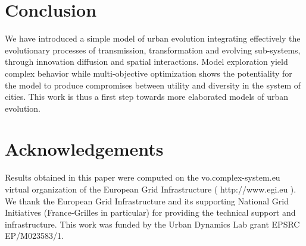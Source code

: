 \documentclass[letterpaper]{article}
\begin{document}
\section{Conclusion}

We have introduced a simple model of urban evolution integrating effectively the evolutionary processes of transmission, transformation and evolving sub-systems, through innovation diffusion and spatial interactions. Model exploration yield complex behavior while multi-objective optimization shows the potentiality for the model to produce compromises between utility and diversity in the system of cities. This work is thus a first step towards more elaborated models of urban evolution.


\bigskip

\section{Acknowledgements}

Results obtained in this paper were computed on the vo.complex-system.eu virtual organization of the European Grid Infrastructure ( http://www.egi.eu ). We thank the European Grid Infrastructure and its supporting National Grid Initiatives (France-Grilles in particular) for providing the technical support and infrastructure. This work was funded by the Urban Dynamics Lab grant EPSRC EP/M023583/1.

\bigskip

\footnotesize

\end{document}
